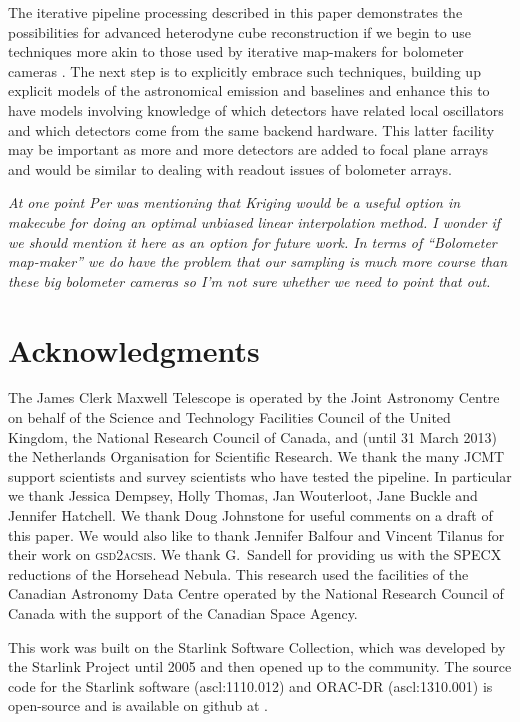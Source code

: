 \documentclass[final,authoryear,5p,times,twocolumn]{elsarticle}
\begin{document}
The iterative pipeline processing described in this paper demonstrates
the possibilities for advanced heterodyne cube reconstruction if we
begin to use techniques more akin to those used by iterative
map-makers for bolometer cameras
\citep[e.g.][]{2013MNRAS.430.2545C}. The next step is to explicitly
embrace such techniques, building up explicit models of the
astronomical emission and baselines and enhance this to have models
involving knowledge of which detectors have related local oscillators
and which detectors come from the same backend hardware. This latter
facility may be important as more and more detectors are added to
focal plane arrays and would be similar to dealing with readout issues
of bolometer arrays.

\textit{\color{red} At one point Per was mentioning that Kriging would be a useful
  option in makecube for doing an optimal unbiased linear
  interpolation method. I wonder if we should mention it here as an
  option for future work. In terms of ``Bolometer map-maker'' we do
  have the problem that our sampling is much more course than these
  big bolometer cameras so I'm not sure whether we need to point that
  out.}

\section{Acknowledgments}

The James Clerk Maxwell Telescope is operated by the Joint Astronomy
Centre on behalf of the Science and Technology Facilities Council of
the United Kingdom, the National Research Council of Canada, and
(until 31 March 2013) the Netherlands Organisation for Scientific
Research. We thank the many JCMT support scientists and survey
scientists who have tested the pipeline. In particular we thank
Jessica Dempsey, Holly Thomas, Jan Wouterloot, Jane Buckle and
Jennifer Hatchell. We thank Doug Johnstone for useful comments on a
draft of this paper. We would also like to thank Jennifer Balfour and
Vincent Tilanus for their work on \textsc{gsd2acsis}. We thank
G.~Sandell for providing us with the SPECX reductions of the Horsehead
Nebula. This research used the facilities of the Canadian Astronomy
Data Centre operated by the National Research Council of Canada with
the support of the Canadian Space Agency.

This work was built on the Starlink Software Collection, which was
developed by the Starlink Project until 2005
\citep{1982QJRAS..23..485D,2005ASPC..347...22D,2008ASPC..394..650C}
and then opened up to the community. The source code for the Starlink
software (ascl:1110.012) and ORAC-DR (ascl:1310.001) is open-source and is
available on github at
.
\end{document}
